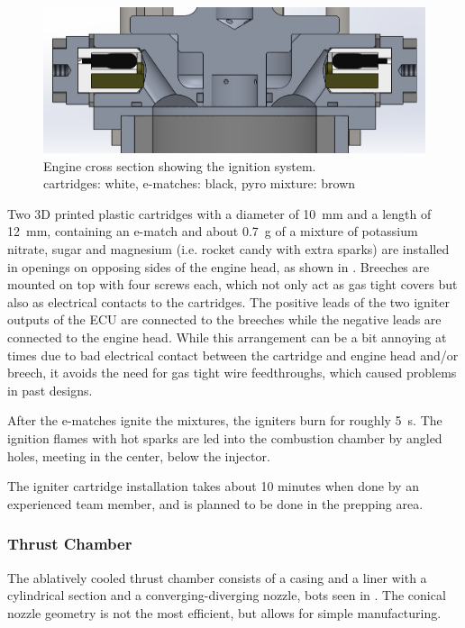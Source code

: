\begin{figure}[H]
\centering
\includegraphics[width=\textwidth]{Propulsion/ignitionCut.png}
\caption{Engine cross section showing the ignition system.\\cartridges: white, e-matches: black, pyro mixture: brown}
\label{fig:sysarch_prop_ignition}
\end{figure}

Two 3D printed plastic cartridges with a diameter of \SI{10}{\milli\meter} and a length of \SI{12}{\milli\meter}, containing an e-match and about \SI{0.7}{\gram} of a mixture of potassium nitrate, sugar and magnesium (i.e. rocket candy with extra sparks) are installed in openings on opposing sides of the engine head, as shown in .
Breeches are mounted on top with four screws each, which not only act as gas tight covers but also as electrical contacts to the cartridges. The positive leads of the two igniter outputs of the ECU are connected to the breeches while the negative leads are connected to the engine head. While this arrangement can be a bit annoying at times due to bad electrical contact between the cartridge and engine head and/or breech, it avoids the need for gas tight wire feedthroughs, which caused problems in past designs.

After the e-matches ignite the mixtures, the igniters burn for roughly \SI{5}{\second}. The ignition flames with hot sparks are led into the combustion chamber by angled holes, meeting in the center, below the injector. 

The igniter cartridge installation takes about 10 minutes when done by an experienced team member, and is planned to be done in the prepping area.

\subsubsection{Thrust Chamber}\label{sec:prop_thrustchamber}

The ablatively cooled thrust chamber consists of a casing and a liner with a cylindrical section and a converging-diverging nozzle, bots seen in . The conical nozzle geometry is not the most efficient, but allows for simple manufacturing.

